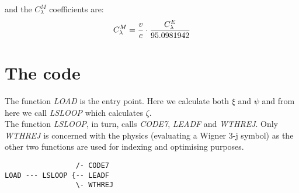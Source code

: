 and the $C_\lambda^{M}$ coefficients are:\\

\begin{equation}
C_\lambda^M = {v \over c} \cdot {C_\lambda^E \over 95.0981942}
\end{equation}

\section{The code}

The function {\em LOAD} is the entry point. Here we calculate both $\xi$ and
$\psi$ and from here we call {\em LSLOOP} which calculates $\zeta$.\\

The function {\em LSLOOP}, in turn, calls {\em CODE7}, {\em LEADF} and {\em
WTHREJ}. Only {\em WTHREJ} is concerned with the physics (evaluating a
Wigner 3-j symbol) as the other two functions are used for indexing and
optimising purposes.\\

\begin{verbatim}
                 /- CODE7
LOAD --- LSLOOP {-- LEADF
                 \- WTHREJ
\end{verbatim}
